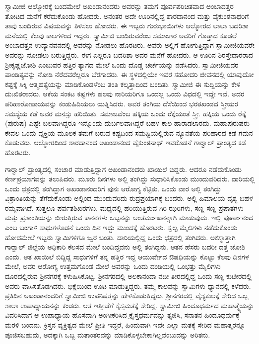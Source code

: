 ಸ್ವಾಮೀಜಿ ಆಲ್ಮೋರಕ್ಕೆ ಬಂದಮೇಲೆ ಅಖಂಡಾನಂದರು ಅವರನ್ನು ತಮಗೆ ಪೂರ್ವಪರಿಚಿತವಾದ ಅಂಬಾದತ್ತರ ತೋಟದ ಮನೆಗೆ ಕರೆದುಕೊಂಡು ಹೋದರು. ಅನಂತರ ಅದೇ ಊರಿನಲ್ಲಿದ್ದ ಶಾರದಾನಂದ ಮತ್ತು ವೈಕುಂಠನಾಥರಿಗೆ ತಾವು ಬಂದಿರುವ ವಿಷಯವನ್ನು ತಿಳಿಸಲು ಹೋದರು. ಈ ಇಬ್ಬರು ಗುರುಭಾಯಿಗಳು ಆಲ್ಮೋರದ ಲಾಲಾ ಬದರಿಶಾ ಮನೆಯಲ್ಲಿ ಕೆಲವು ಕಾಲಗಳಿಂದ ಇದ್ದರು. ಸ್ವಾಮೀಜಿ ಬಂದಿರುವರೆಂಬ ಸಮಾಚಾರ ಅವರಿಗೆ ಗೊತ್ತಾದ ಕೂಡಲೆ ಅಂಬಾದತ್ತನ ಉದ್ಯಾನವನದಲ್ಲಿ ಅವರನ್ನು ನೋಡಲು ಹೊರಟರು. ಅವರು ಅಲ್ಲಿಗೆ ಹೋಗುತ್ತಿದ್ದಾಗ ಸ್ವಾಮೀಜಿಯವರೇ ಅವರನ್ನು ನೋಡಲು ಬರುತ್ತಿದ್ದರು. ಈಗ ಎಲ್ಲರೂ ಬದರಿಶಾ ಅವರ ಮನೆಗೆ ಹೋದರು. ಆ ಊರಿನ ಶಿರಸ್ತೇದಾರರಾದ ಶ‍್ರೀಕೃಷ್ಣಜೋಶಿ ಎಂಬುವರ ಹತ್ತಿರ ತ್ಯಾಗದ ಮೇಲೆ ಒಂದು ದೊಡ್ಡ ಚರ್ಚೆಯನ್ನು ನಡೆಸಿದರು. ಸ್ವಾಮೀಜಿಯವರ ಪಾಂಡಿತ್ಯವನ್ನು ನೋಡಿ ನೆರೆದವರೆಲ್ಲರೂ ಬೆರಗಾದರು. ಈ ಸ್ಥಳದಲ್ಲಿಯೇ ಇವರ ಸಹೋದರಿ ಜೀವನದಲ್ಲಿ ಯಾವುದೋ ಕಷ್ಟಕ್ಕೆ ಸಿಕ್ಕಿ ಆತ್ಮಹತ್ಯೆಯನ್ನು ಮಾಡಿಕೊಂಡಳೆಂಬ ತಂತಿ ಕಲ್ಕತ್ತಾದಿಂದ ಬಂದಿತು. ಸ್ವಾಮೀಜಿ ಈ ಸುದ್ದಿಯನ್ನು ಕೇಳಿ ದುಃಖಿತರಾದರು. ಆಕೆಯ ಸಂಕಟ ಕಷ್ಟಗಳು ಹಲವು ನಾರಿಯರಿಗೂ ಒಂದಲ್ಲ ಒಂದು ವಿಧದಲ್ಲಿ ಇದ್ದೇ ಇವೆ. ಅದರ ಪರಿಹಾರೋಪಾಯವನ್ನು ಕಂಡುಹಿಡಿಯಲು ಯತ್ನಿಸಿದರು. ಅವರ ತಂಗಿಯ ದೆಸೆಯಿಂದ ಭರತಖಂಡದ ಸ್ತ್ರೀಯರ ಸಮಸ್ಯೆಯ ಕಡೆ ಅವರ ಮನಸ್ಸು ಹರಿಯಿತು. ಸಮಾಜವೆಂಬ ಹಕ್ಕಿಯ ಒಂದು ರೆಕ್ಕೆಯಂತೆ ಸ್ತ್ರೀ. ಹಕ್ಕಿಯ ಒಂದು ರೆಕ್ಕೆ (ಪುರುಷ) ಎಷ್ಟೇ ಬಲವಾಗಿದ್ದರೂ ಇನ್ನೊಂದು ದುರ್ಬಲವಾಗಿದ್ದರೆ ಬಹಳ ಕಾಲ ಹಾರಾಡಲಾರದು. ಮಹಾಪುರುಷರು ಕೇವಲ ಒಂದು ವ್ಯಕ್ತಿಯ ಮೂಲಕ ತಮಗೆ ಬರುವ ಕಷ್ಟದಿಂದ ಸಮಷ್ಟಿಯಲ್ಲಿರುವ ನ್ಯೂನತೆಯ ಪರಿಹಾರದ ಕಡೆ ಗಮನ ಕೊಡುವರು. ಆಲ್ಮೋರದಿಂದ ಶಾರದಾನಂದ ಅಖಂಡಾನಂದ ವೈಕುಂಠನಾಥ್ ಇವರೊಡನೆ ಗಾರ್‍ವಾಲ್ ಪ್ರಾಂತ್ಯದ ಕಡೆ ಹೊರಟರು. 

ಗಾರ್‍ವಾಲ್ ಪ್ರಾಂತ್ಯದಲ್ಲಿ ಸಂಚಾರ ಮಾಡುತ್ತಿದ್ದಾಗ ಅಖಂಡಾನಂದರು ಖಾಯಿಲೆ ಬಿದ್ದರು. ಆದರೂ ನಡೆದುಕೊಂಡು ಕರ್ಣಪ್ರಯಾಗವನ್ನು ತಲುಪಿದರು. ಮೂರು ದಿನಗಳು ಅಲ್ಲಿ ತಂಗಿದ್ದು ಸುಧಾರಿಸಿಕೊಂಡು ಮುಂದುವರಿದರು. ದಾರಿಯಲ್ಲಿ ಒಂದು ಛತ್ರದಲ್ಲಿ ತಂಗಿದ್ದಾಗ ಅಖಂಡಾನಂದರಿಗೆ ಪುನಃ ಆರೋಗ್ಯ ಕೆಟ್ಟಿತು. ಒಂದು ವಾರ ಅಲ್ಲಿ ತಂಗಿದ್ದು ವಿಶ್ರಾಂತಿಯನ್ನು ತೆಗೆದುಕೊಂಡು ಅಲ್ಲಿಂದ ಮುಂದುವರಿದು ರುದ್ರಪ್ರಯಾಗಕ್ಕೆ ಬಂದರು. ಅಲ್ಲಿ ಹಿಮಾಲಯ ದೃಶ್ಯ ಬಹಳ ರಮ್ಯವಾಗಿದೆ. ಸುತ್ತಲೂ ಪರ್ವತಶಿಖರಗಳು, ಮಧ್ಯದಲ್ಲಿ ಹರಿಯುತ್ತಿರುವ ಗಿರಿ ಝರಿಗಳು, ಸಣ್ಣ ಸಣ್ಣ ಪ್ರಪಾತಗಳು ಮತ್ತು ಪ್ರಶಾಂತಿಯನ್ನು ಬೀರುತ್ತಿರುವ ಕಾನನಗಳು ಒಬ್ಬನನ್ನು ಅಂತರ್ಮುಖನನ್ನಾಗಿ ಮಾಡುವುದು. ಇಲ್ಲಿ ಪೂರ್ಣಾನಂದ ಎಂಬ ಬಂಗಾಳಿ ಸಾಧುಗಳೊಡನೆ ಒಂದು ದಿನ ಇದ್ದು ಮುಂದಕ್ಕೆ ಹೊರಟರು. ಸ್ವಲ್ಪ ಮೈಲಿಗಳು ನಡೆದುಕೊಂಡು ಹೋದಮೇಲೆ ಇಬ್ಬರು ಸ್ವಾಮಿಗಳಿಗೂ ಜ್ವರ ಬಂತು. ದಾರಿಯಲ್ಲಿದ್ದ ಒಂದು ಛತ್ರದಲ್ಲಿ ತಂಗಿದರು. ಅಕಸ್ಮಾತ್ತಾಗಿ ಗಾರ್‍ವಾಲ್ ಜಿಲ್ಲೆಯ ಅಧಿಕಾರಿ ಕೆಲಸದ ಮೇಲೆ ಬಂದಿದ್ದವನು ಅಲ್ಲಿ ತಂಗಿದ್ದನು. ಆತನ ಹೆಸರು ಬದರೀ ದತ್ತ ಜೋಶಿ ಎಂದು. ಆತ ಖಾಯಿಲೆ ಬಿದ್ದಿದ್ದ ಸಾಧುಗಳಿಗೆ ತನ್ನ ಹತ್ತಿರ ಇದ್ದ ಆಯುರ್ವೇದ ಔಷಧಿಯನ್ನು ಕೊಟ್ಟು ಕೆಲವು ದಿನಗಳ ಮೇಲೆ, ಅವರ ಆರೋಗ್ಯ ಉತ್ತಮಗೊಂಡ ಮೇಲೆ ಅವರನ್ನು ಒಂದು ದಂಡಿಯಲ್ಲಿ ಒಂಭತ್ತು ಮೈಲಿಗಳು ದೂರದಲ್ಲಿರುವ ಶ‍್ರೀನಗರಕ್ಕೆ ಕಳುಹಿಸಿಕೊಟ್ಟ. ಶ‍್ರೀನಗರದಲ್ಲಿ ಅಲಕಾನಂದಾ ನದೀ ತೀರದಲ್ಲಿದ್ದ ಒಂದು ಸಣ್ಣ ಕುಟೀರದಲ್ಲಿ ಅವರು ವಾಸಿಸತೊಡಗಿದರು. ಭಿಕ್ಷೆಯಿಂದ ಊಟ ಮಾಡುತ್ತಿದ್ದರು. ತಮ್ಮ ಕಾಲವನ್ನು ಸ್ವಾಮಿಗಳು ಧ್ಯಾನದಲ್ಲಿ ಕಳೆದರು. ಪ್ರತಿದಿನ ಅಖಂಡಾನಂದರಿಗೆ ಸ್ವಾಮೀಜಿ ಉಪನಿಷತ್ತನ್ನು ಹೇಳಿಕೊಡುತ್ತಿದ್ದರು. ಶ‍್ರೀನಗರದಲ್ಲಿ ವೈಶ್ಯಕುಲಕ್ಕೆ ಸೇರಿದ ಒಬ್ಬ ಶಾಲಾ ಉಪಾಧ್ಯಾಯನನ್ನು ಕಂಡರು. ಆತ ಇತ್ತೀಚೆಗೆ ಕೈಸ್ತಮತಕ್ಕೆ ಸೇರಿದ್ದ. ಸ್ವಾಮೀಜಿ ಹಿಂದೂಧರ್ಮದ ಮಹಾತ್ಮ್ಯೆಯನ್ನು ವಿವರಿಸಿದಾಗ ಆ ಉಪಾಧ್ಯಾಯ ಹೊಸದಾಗಿ ಅಂಗೀಕರಿಸಿದ ಕ್ರೈಸ್ತಧರ್ಮವನ್ನು ತ್ಯಜಿಸಿ, ಸನಾತನ ಹಿಂದೂಧರ್ಮಕ್ಕೆ ಮರಳಿ ಬಂದನು. ಕ್ರಿಸ್ತನ ವ್ಯಕ್ತಿತ್ವದ ಮೇಲೆ ಪ್ರೀತಿ ಇದ್ದರೆ, ಹಿಂದುವಾಗಿ ಇದೇ ಎಲ್ಲಾ ಮತಕ್ಕೆ ಸೇರಿದ ಮಹಾತ್ಮರನ್ನೂ ಪೂಜಿಸಬಹುದು, ಅದಕ್ಕಾಗಿ ಒಬ್ಬ ಮತಾಂತರವನ್ನು ಮಾಡಿಕೊಳ್ಳಬೇಕಾಗಿಲ್ಲವೆಂಬುದನ್ನು ಅರಿತನು. 


